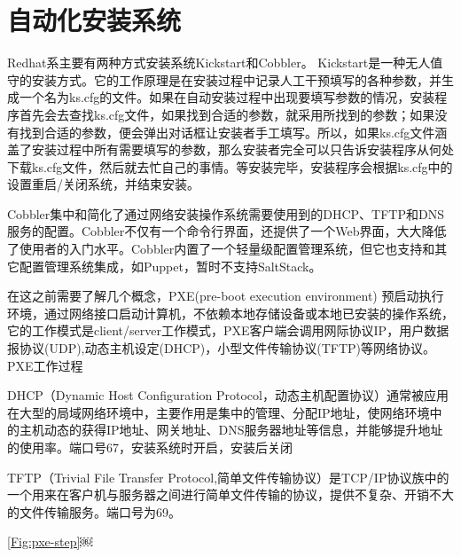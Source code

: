 \chapter{自动化安装系统}


Redhat系主要有两种方式安装系统Kickstart和Cobbler。
Kickstart是一种无人值守的安装方式。它的工作原理是在安装过程中记录人工干预填写的各种参数，并生成一个名为ks.cfg的文件。如果在自动安装过程中出现要填写参数的情况，安装程序首先会去查找ks.cfg文件，如果找到合适的参数，就采用所找到的参数；如果没有找到合适的参数，便会弹出对话框让安装者手工填写。所以，如果ks.cfg文件涵盖了安装过程中所有需要填写的参数，那么安装者完全可以只告诉安装程序从何处下载ks.cfg文件，然后就去忙自己的事情。等安装完毕，安装程序会根据ks.cfg中的设置重启/关闭系统，并结束安装。

Cobbler集中和简化了通过网络安装操作系统需要使用到的DHCP、TFTP和DNS服务的配置。Cobbler不仅有一个命令行界面，还提供了一个Web界面，大大降低了使用者的入门水平。Cobbler内置了一个轻量级配置管理系统，但它也支持和其它配置管理系统集成，如Puppet，暂时不支持SaltStack。

在这之前需要了解几个概念，PXE(pre-boot execution environment) 预启动执行环境，通过网络接口启动计算机，不依赖本地存储设备或本地已安装的操作系统，它的工作模式是client/server工作模式，PXE客户端会调用网际协议IP，用户数据报协议(UDP),动态主机设定(DHCP)，小型文件传输协议(TFTP)等网络协议。
PXE工作过程

DHCP（Dynamic Host Configuration Protocol，动态主机配置协议）通常被应用在大型的局域网络环境中，主要作用是集中的管理、分配IP地址，使网络环境中的主机动态的获得IP地址、网关地址、DNS服务器地址等信息，并能够提升地址的使用率。端口号67，安装系统时开启，安装后关闭

 TFTP（Trivial File Transfer Protocol,简单文件传输协议）是TCP/IP协议族中的一个用来在客户机与服务器之间进行简单文件传输的协议，提供不复杂、开销不大的文件传输服务。端口号为69。

\ref{Fig:pxe-step}￼

